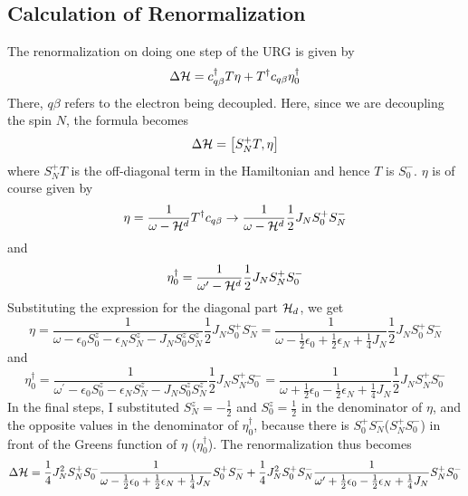 \documentclass[12pt,twoside]{report}
\numberwithin{equation}{section}
\begin{document}
\subsection{Calculation of Renormalization}
The renormalization on doing one step of the URG is given by
\begin{equation}
	\Delta \mathcal{H} = c_{q\beta}^\dagger T \eta + T^\dagger c_{q\beta} \eta_0^\dagger
\end{equation}
There, \(q\beta\) refers to the electron being decoupled. Here, since we are decoupling the spin \(N\), the formula becomes
\begin{equation}
	\Delta \mathcal{H} = \left[S_N^+T,\eta\right]
\end{equation}
where \(S_N^+T\) is the  off-diagonal term in the Hamiltonian and hence \(T\) is  \(S_0^-\). \(\eta\) is of course given by
\begin{equation}
	\eta = \frac{1}{\omega - \mathcal{H}^d}T^\dagger c_{q\beta} \to \frac{1}{\omega - \mathcal{H}^d}\frac{1}{2}J_N S_0^+ S_N^-
\end{equation}
and
\begin{equation}
	\eta_0^\dagger = \frac{1}{\omega^\prime - \mathcal{H}^d}\frac{1}{2}J_N S_N^+ S_0^-
\end{equation}
Substituting the expression for the diagonal part \(\mathcal{H}_d\), we get
\begin{equation}
	\label{stareta}
	\eta  = \frac{1}{\omega - \epsilon_0 S^z_0 - \epsilon_N S^z_N - J_NS^z_0 S^z_N}\frac{1}{2}J_NS_0^+ S_N^- = \frac{1}{\omega - \frac{1}{2}\epsilon_0 + \frac{1}{2}\epsilon_N + \frac{1}{4}J_N}\frac{1}{2}J_NS_0^+ S_N^-
\end{equation}
and
\begin{equation}
	\eta_0^\dagger = \frac{1}{\omega^\prime - \epsilon_0 S^z_0 - \epsilon_N S^z_N - J_NS^z_0 S^z_N}\frac{1}{2}J_NS_N^+ S_0^- = \frac{1}{\omega + \frac{1}{2}\epsilon_0 - \frac{1}{2}\epsilon_N + \frac{1}{4}J_N}\frac{1}{2}J_NS_N^+ S_0^-
\end{equation}
In the final steps, I substituted \(S_N^z = -\frac{1}{2}\) and \(S_0^z = \frac{1}{2}\) in the denominator of \(\eta\), and the opposite values in the denominator of \(\eta_0^\dagger\), because there is \(S_0^+ S_N^-\)(\(S_N^+ S_0^-\)) in front of the Greens function of \(\eta\) (\(\eta_0^\dagger\)). The renormalization thus becomes
\begin{equation}
	\Delta \mathcal{H} = \frac{1}{4}J_N^2 S_N^+S_0^- \frac{1}{\omega - \frac{1}{2}\epsilon_0 + \frac{1}{2}\epsilon_N + \frac{1}{4}J_N}S_0^+ S_N^- + \frac{1}{4}J_N^2S_0^+ S_N^- \frac{1}{\omega^\prime + \frac{1}{2}\epsilon_0 - \frac{1}{2}\epsilon_N + \frac{1}{4}J_N} S_N^+S_0^-
\end{equation}
\end{document}

